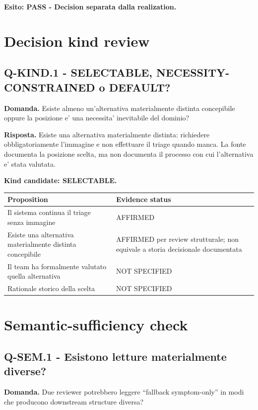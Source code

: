 \documentclass[11pt,a4paper]{article}
\begin{document}
\textbf{Esito: PASS - Decision separata dalla realization.}

\section{Decision kind review}

\subsection{Q-KIND.1 - SELECTABLE, NECESSITY-CONSTRAINED o DEFAULT?}
\begin{ddtacheck}
\textbf{Domanda.} Esiste almeno un'alternativa materialmente distinta concepibile oppure la posizione e' una necessita' inevitabile del dominio?
\end{ddtacheck}

\textbf{Risposta.} Esiste una alternativa materialmente distinta: richiedere obbligatoriamente l'immagine e non effettuare il triage quando manca. La fonte documenta la posizione scelta, ma non documenta il processo con cui l'alternativa e' stata valutata.

\textbf{Kind candidate: SELECTABLE.}

\begin{tabularx}{\textwidth}{L{55mm}Y}
\toprule
\textbf{Proposition} & \textbf{Evidence status} \\
\midrule
Il sistema continua il triage senza immagine & AFFIRMED \\
Esiste una alternativa materialmente distinta concepibile & AFFIRMED per review strutturale; non equivale a storia decisionale documentata \\
Il team ha formalmente valutato quella alternativa & NOT SPECIFIED \\
Rationale storico della scelta & NOT SPECIFIED \\
\bottomrule
\end{tabularx}

\section{Semantic-sufficiency check}

\subsection{Q-SEM.1 - Esistono letture materialmente diverse?}
\begin{ddtacheck}
\textbf{Domanda.} Due reviewer potrebbero leggere ``fallback symptom-only'' in modi che producono downstream structure diversa?
\end{ddtacheck}
\end{document}
